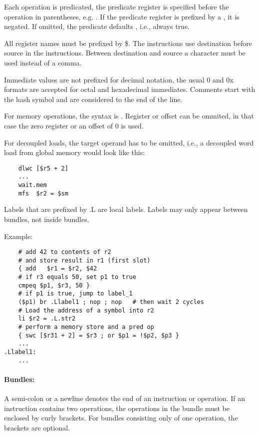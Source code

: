 Each operation is predicated, the predicate register is specified before the operation in
parentheses, e.g. .  If the predicate register is prefixed by a \code{!}, it is negated.
If omitted, the predicate defaults , i.e., always true.

All register names must be prefixed by \$. The instructions use destination before source in the
instructions. Between destination and source a \code{=} character must be used instead of a comma.

Immediate values are not prefixed for decimal notation, the usual 0 and 0x formats are accepted for
octal and hexadecimal immediates. Comments start with the hash symbol \code{\#} and are considered to the
end of the line.

For memory operations, the syntax is . Register or offset can be ommited, in
that case the zero register  or an offset of $0$ is used.

For decoupled loads, the target operand  has to be omitted, i.e., a decoupled word load from global
memory would look like this:

\begin{verbatim}
    dlwc [$r5 + 2]
    ...
    wait.mem
    mfs  $r2 = $sm
\end{verbatim}

Labels that are prefixed by .L are local labels. Labels may only appear between bundles, not inside bundles.

Example:
\begin{verbatim}
    # add 42 to contents of r2
    # and store result in r1 (first slot)
    { add   $r1 = $r2, $42
    # if r3 equals 50, set p1 to true
    cmpeq $p1, $r3, 50 }
    # if p1 is true, jump to label_1
    ($p1) br .Llabel1 ; nop ; nop   # then wait 2 cycles
    # Load the address of a symbol into r2
    li $r2 = .L.str2
    # perform a memory store and a pred op
    { swc [$r31 + 2] = $r3 ; or $p1 = !$p2, $p3 }
    ...
.Llabel1:
    ...
\end{verbatim}


\paragraph{Bundles:}
A semi-colon \code{;} or a newline denotes the end of an instruction or operation. If an instruction contains
two operations, the operations in the bundle must be enclosed by curly brackets. For bundles consisting
only of one operation, the brackets are optional.

